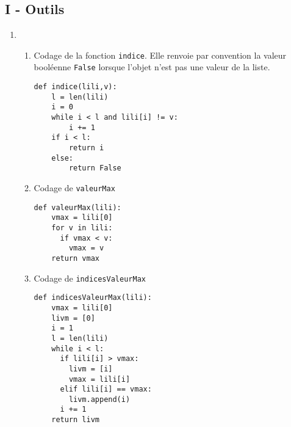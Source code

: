 \subsection*{I - Outils}
\begin{enumerate}
  \item
\begin{enumerate}
  \item   Codage de la fonction \texttt{indice}. Elle renvoie par convention la valeur booléenne \texttt{False} lorsque l'objet n'est pas une valeur de la liste.
\begin{verbatim}
def indice(lili,v):
    l = len(lili)
    i = 0
    while i < l and lili[i] != v:
        i += 1
    if i < l:
        return i
    else:
        return False
\end{verbatim}

  \item Codage de \texttt{valeurMax}
\begin{verbatim}
def valeurMax(lili):
    vmax = lili[0]
    for v in lili:
      if vmax < v:
        vmax = v
    return vmax
\end{verbatim}
  
  
  \item Codage de \texttt{indicesValeurMax}
\begin{verbatim}
def indicesValeurMax(lili):
    vmax = lili[0]
    livm = [0]
    i = 1 
    l = len(lili)
    while i < l:
      if lili[i] > vmax:
        livm = [i]
        vmax = lili[i]
      elif lili[i] == vmax:
        livm.append(i)
      i += 1
    return livm
\end{verbatim}
  
\end{enumerate}
  


\end{enumerate}
